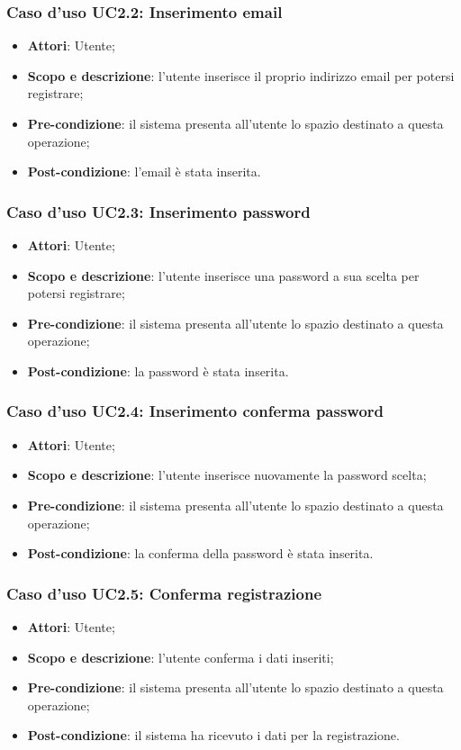 \subsubsection{Caso d'uso UC2.2: Inserimento email}
\begin{itemize}
\item \textbf{Attori}: Utente;
\item \textbf{Scopo e descrizione}: l'utente inserisce il proprio indirizzo email per potersi registrare;
\item \textbf{Pre-condizione}: il sistema presenta all'utente lo spazio destinato a questa operazione;
\item \textbf{Post-condizione}: l'email è stata inserita.
\end{itemize}

\subsubsection{Caso d'uso UC2.3: Inserimento password}
\begin{itemize}
\item \textbf{Attori}: Utente;
\item \textbf{Scopo e descrizione}: l'utente inserisce una password a sua scelta per potersi registrare;
\item \textbf{Pre-condizione}: il sistema presenta all'utente lo spazio destinato a questa operazione;
\item \textbf{Post-condizione}: la password è stata inserita.
\end{itemize}

\subsubsection{Caso d'uso UC2.4: Inserimento conferma password}
\begin{itemize}
\item \textbf{Attori}: Utente;
\item \textbf{Scopo e descrizione}: l'utente inserisce nuovamente la password scelta;
\item \textbf{Pre-condizione}: il sistema presenta all'utente lo spazio destinato a questa operazione;
\item \textbf{Post-condizione}: la conferma della password è stata inserita.
\end{itemize}

\subsubsection{Caso d'uso UC2.5: Conferma registrazione}
\begin{itemize}
\item \textbf{Attori}: Utente;
\item \textbf{Scopo e descrizione}: l'utente conferma i dati inseriti;
\item \textbf{Pre-condizione}: il sistema presenta all'utente lo spazio destinato a questa operazione;
\item \textbf{Post-condizione}: il sistema ha ricevuto i dati per la registrazione.
\end{itemize}


